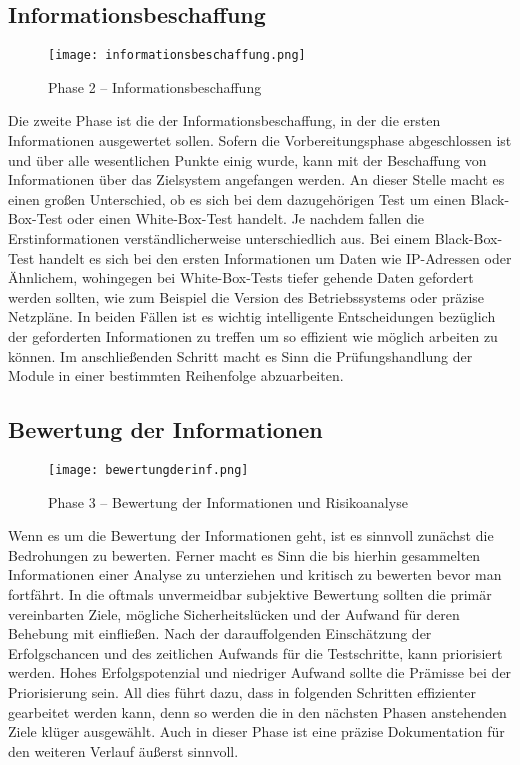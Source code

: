 \subsection{Informationsbeschaffung}
\label{infobeschaffung}

\begin{figure}[h]
	\centering
	\texttt{[image: informationsbeschaffung.png]}
	\caption{Phase 2 – Informationsbeschaffung}
\end{figure}

Die zweite Phase ist die der Informationsbeschaffung, in der die ersten Informationen ausgewertet sollen. Sofern die Vorbereitungsphase abgeschlossen ist und über alle wesentlichen Punkte einig wurde, kann mit der Beschaffung von Informationen über das Zielsystem angefangen werden. An dieser Stelle macht es einen großen Unterschied, ob es sich bei dem dazugehörigen Test um einen Black-Box-Test oder einen White-Box-Test handelt. Je nachdem fallen die Erstinformationen verständlicherweise unterschiedlich aus. Bei einem Black-Box-Test handelt es sich bei den ersten Informationen um Daten wie IP-Adressen oder Ähnlichem, wohingegen bei White-Box-Tests tiefer gehende Daten gefordert werden sollten, wie zum Beispiel die Version des Betriebssystems oder präzise Netzpläne. In beiden Fällen ist es wichtig intelligente Entscheidungen bezüglich der geforderten Informationen zu treffen um so effizient wie möglich arbeiten zu können. Im anschließenden Schritt macht es Sinn die Prüfungshandlung der Module in einer bestimmten Reihenfolge abzuarbeiten\cite[102--103]{pt03bsi}.

\subsection{Bewertung der Informationen}
\label{bewinfrisiko}

\begin{figure}[h]
	\centering
	\texttt{[image: bewertungderinf.png]}
	\caption{Phase 3 – Bewertung der Informationen und Risikoanalyse}
\end{figure}

Wenn es um die Bewertung der Informationen geht, ist es sinnvoll zunächst die Bedrohungen zu bewerten. Ferner macht es Sinn die bis hierhin gesammelten Informationen einer Analyse zu unterziehen und kritisch zu bewerten bevor man fortfährt. In die oftmals unvermeidbar subjektive Bewertung sollten die primär vereinbarten Ziele, mögliche Sicherheitslücken und der Aufwand für deren Behebung mit einfließen. Nach der darauffolgenden Einschätzung der Erfolgschancen und des zeitlichen Aufwands für die Testschritte, kann priorisiert werden. Hohes Erfolgspotenzial und niedriger Aufwand sollte die Prämisse bei der Priorisierung sein. All dies führt dazu, dass in folgenden Schritten effizienter gearbeitet werden kann, denn so werden die in den nächsten Phasen anstehenden Ziele klüger ausgewählt. Auch in dieser Phase ist eine präzise Dokumentation für den weiteren Verlauf äußerst sinnvoll\cite[103--104]{pt03bsi}.

